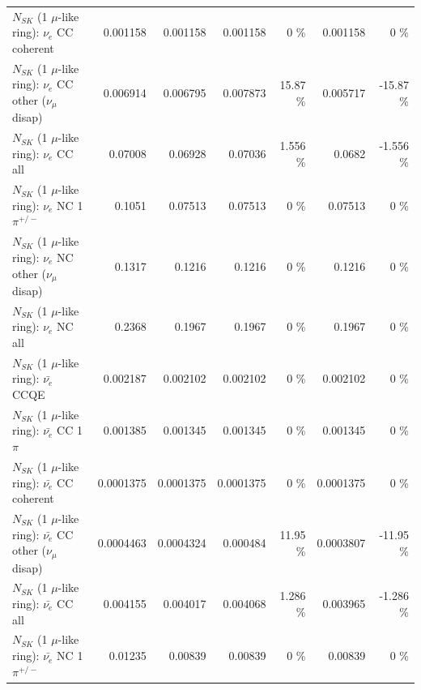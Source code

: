 \begin{table}
\begin{tabular}{| l | r | r | r  r | r  r |}
                               $N_{SK}$ (1 $\mu$-like ring): $\nu_e$ CC coherent &        0.001158 &        0.001158 &        0.001158 &        0 \%  &        0.001158 &        0 \%  \\ 
                $N_{SK}$ (1 $\mu$-like ring): $\nu_e$ CC other ($\nu_\mu$ disap) &        0.006914 &        0.006795 &        0.007873 &    15.87 \%  &        0.005717 &   -15.87 \%  \\ 
                                  $N_{SK}$ (1 $\mu$-like ring): $\nu_{e}$ CC all &         0.07008 &         0.06928 &         0.07036 &    1.556 \%  &          0.0682 &   -1.556 \%  \\ 
\hline
                           $N_{SK}$ (1 $\mu$-like ring): $\nu_e$ NC 1$\pi^{+/-}$ &          0.1051 &         0.07513 &         0.07513 &        0 \%  &         0.07513 &        0 \%  \\ 
                $N_{SK}$ (1 $\mu$-like ring): $\nu_e$ NC other ($\nu_\mu$ disap) &          0.1317 &          0.1216 &          0.1216 &        0 \%  &          0.1216 &        0 \%  \\ 
                                  $N_{SK}$ (1 $\mu$-like ring): $\nu_{e}$ NC all &          0.2368 &          0.1967 &          0.1967 &        0 \%  &          0.1967 &        0 \%  \\ 
\hline
\hline
\hline
                                $N_{SK}$ (1 $\mu$-like ring): $\bar{\nu_e}$ CCQE &        0.002187 &        0.002102 &        0.002102 &        0 \%  &        0.002102 &        0 \%  \\ 
                           $N_{SK}$ (1 $\mu$-like ring): $\bar{\nu_e}$ CC 1$\pi$ &        0.001385 &        0.001345 &        0.001345 &        0 \%  &        0.001345 &        0 \%  \\ 
                         $N_{SK}$ (1 $\mu$-like ring): $\bar{\nu_e}$ CC coherent &       0.0001375 &       0.0001375 &       0.0001375 &        0 \%  &       0.0001375 &        0 \%  \\ 
          $N_{SK}$ (1 $\mu$-like ring): $\bar{\nu_e}$ CC other ($\nu_\mu$ disap) &       0.0004463 &       0.0004324 &        0.000484 &    11.95 \%  &       0.0003807 &   -11.95 \%  \\ 
                            $N_{SK}$ (1 $\mu$-like ring): $\bar{\nu_{e}}$ CC all &        0.004155 &        0.004017 &        0.004068 &    1.286 \%  &        0.003965 &   -1.286 \%  \\ 
\hline
                     $N_{SK}$ (1 $\mu$-like ring): $\bar{\nu_e}$ NC 1$\pi^{+/-}$ &         0.01235 &         0.00839 &         0.00839 &        0 \%  &         0.00839 &        0 \%  \\ 

\end{tabular}
\end{table}
